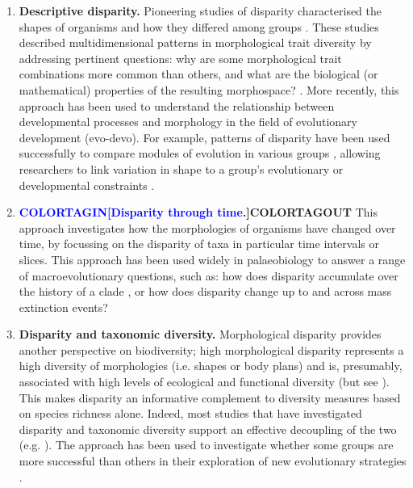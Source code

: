 \documentclass[12pt,letterpaper]{article}
\begin{document}
\begin{enumerate}

	\item \textbf{Descriptive disparity.} Pioneering studies of disparity characterised the shapes of organisms and how they differed among groups \citep{Foote1995, Briggs1992}.
	These studies described multidimensional patterns in morphological trait diversity by addressing pertinent questions: why are some morphological trait combinations more common than others, and what are the biological (or mathematical) properties of the resulting morphospace? \citep{Foote1995, Raup1961, Gerber2017}.
	More recently, this approach has been used to understand the relationship between developmental processes and morphology in the field of evolutionary development (evo-devo).
	For example, patterns of disparity have been used successfully to compare modules of evolution in various groups \citep{goswami2010influence,bardua2019morphological}, allowing researchers to link variation in shape to a group's evolutionary or developmental constraints \citep{Hipsley2017}.

	\item \textbf{\textcolor{blue}{COLORTAGIN[Disparity through time}.]COLORTAGOUT} This approach investigates how the morphologies of organisms have changed over time, by focussing on the disparity of taxa in particular time intervals or slices.
	This approach has been used widely in palaeobiology to answer a range of macroevolutionary questions, such as: how does disparity accumulate over the history of a clade \citep{prentice2011evolution, Guillerme2018}, or how does disparity change up to and across mass extinction events\citep{Friedman2010}?

	\item \textbf{Disparity and taxonomic diversity.} Morphological disparity provides another perspective on biodiversity; high morphological disparity represents a high diversity of morphologies (i.e.
	shapes or body plans) and is, presumably, associated with high levels of ecological and functional diversity (but see \citealt{anderson2012}).
	This makes disparity an informative complement to diversity measures based on species richness alone.
	Indeed, most studies that have investigated disparity and taxonomic diversity support an effective decoupling of the two (e.g. \citealt{Fortey1996, Hopkins2013}).
	The approach has been used to investigate whether some groups are more successful than others in their exploration of new evolutionary strategies \citep{pierce2008patterns}.


\end{enumerate}
\end{document}
